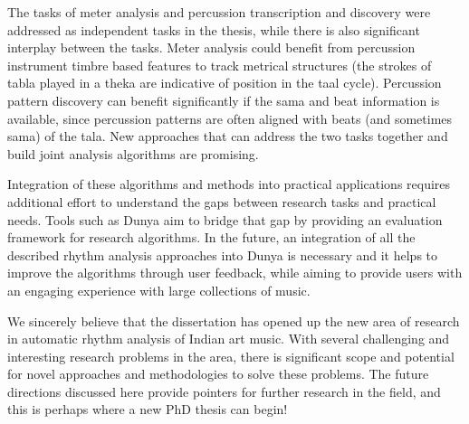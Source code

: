 The tasks of meter analysis and percussion transcription and discovery were addressed as independent tasks in the thesis, while there is also significant interplay between the tasks. Meter analysis could benefit from percussion instrument timbre based features to track metrical structures (the strokes of \gls{tabla} played in a \gls{theka} are indicative of position in the \gls{taal} cycle). Percussion pattern discovery can benefit significantly if the \gls{sama} and beat information is available, since percussion patterns are often aligned with beats (and sometimes \gls{sama}) of the \gls{tala}. New approaches that can address the two tasks together and build joint analysis algorithms are promising. 

Integration of these algorithms and methods into practical applications requires additional effort to understand the gaps between research tasks and practical needs. Tools such as Dunya aim to bridge that gap by providing an evaluation framework for research algorithms. In the future, an integration of all the described rhythm analysis approaches into Dunya is necessary and it helps to improve the algorithms through user feedback, while aiming to provide users with an engaging experience with large collections of music. 

We sincerely believe that the dissertation has opened up the new area of research in automatic rhythm analysis of Indian art music. With several challenging and interesting research problems in the area, there is significant scope and potential for novel approaches and methodologies to solve these problems. The future directions discussed here provide pointers for further research in the field, and this is perhaps where a new PhD thesis can begin! 